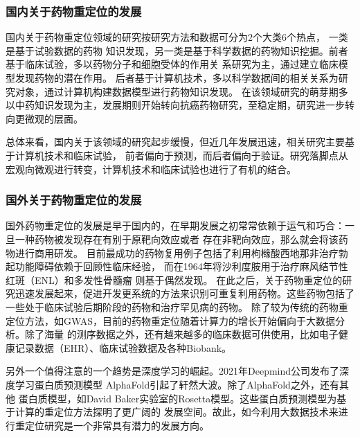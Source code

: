 \subsubsection{国内关于药物重定位的发展}
\par 国内关于药物重定位领域的研究按研究方法和数据可分为2个大类6个热点，
一类是基于试验数据的药物 知识发现，另一类是基于科学数据的药物知识挖掘。前者基于临床试验，多以药物分子和细胞受体的作用关 系研究为主，通过建立临床模型发现药物的潜在作用。
后者基于计算机技术，多以科学数据间的相关关系为研究对象，通过计算机构建数据模型进行药物知识发现。
在该领域研究的萌芽期多以中药知识发现为主，发展期则开始转向抗癌药物研究，至稳定期，研究进一步转向更微观的层面\cite{TaiYangFangGuoNeiYaoWuChongDingWeiYanJiuDeZhuTiJiFaZhanMaiLuoFenXi2020}。

\par 总体来看，国内关于该领域的研究起步缓慢，但近几年发展迅速，相关研究主要基于计算机技术和临床试验，
前者偏向于预测，而后者偏向于验证。研究落脚点从宏观向微观进行转变，计算机技术和临床试验也进行了有机的结合\cite{TaiYangFangGuoNeiYaoWuChongDingWeiYanJiuDeZhuTiJiFaZhanMaiLuoFenXi2020}。
\subsubsection{国外关于药物重定位的发展}
国外药物重定位的发展是早于国内的，在早期发展之初常常依赖于运气和巧合：一旦一种药物被发现存在有别于原靶向效应或者
存在非靶向效应，那么就会将该药物进行商用研发\cite{pushpakomDrugRepurposingProgress2019}。
目前最成功的药物复用例子包括了利用枸橼酸西地那非治疗勃起功能障碍依赖于回顾性临床经验，
而在1964年将沙利度胺用于治疗麻风结节性红斑（ENL）\cite{ashburnDrugRepositioningIdentifying2004}和多发性骨髓瘤
\cite{singhalAntitumorActivityThalidomide1999}则基于偶然发现。
在此之后，关于药物重定位的研究迅速发展起来，促进开发更系统的方法来识别可重复利用药物。这些药物包括了
一些处于临床试验后期阶段的药物和治疗罕见病的药物\cite{pushpakomDrugRepurposingProgress2019}。
除了较为传统的药物重定位方法，如GWAS，目前的药物重定位随着计算力的增长开始偏向于大数据分析。除了海量
的测序数据之外，还有越来越多的临床数据可供使用，比如电子健康记录数据（EHR）、临床试验数据及各种Biobank。
\par 另外一个值得注意的一个趋势是深度学习的崛起。2021年Deepmind公司发布了深度学习蛋白质预测模型
AlphaFold\cite{jumperHighlyAccurateProtein2021}引起了轩然大波。除了AlphaFold之外，还有其他
蛋白质模型，如David Baker实验室的Rosetta模型。这些蛋白质预测模型为基于计算的重定位方法探明了更广阔的
发展空间。故此，如今利用大数据技术来进行重定位研究是一个非常具有潜力的发展方向。


